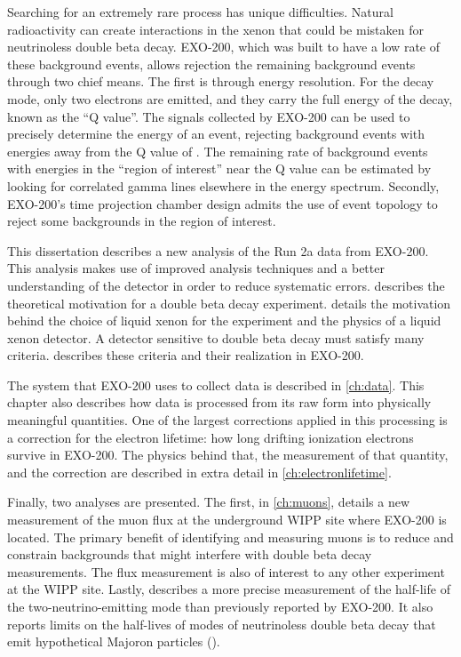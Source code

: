 \documentclass[herrin-thesis.tex]{subfiles}
\begin{document}
Searching for an extremely rare process has unique difficulties. Natural radioactivity can create interactions in the xenon that could be mistaken for neutrinoless double beta decay. EXO-200, which was built to have a low rate of these background events, allows rejection the remaining background events through two chief means. The first is through energy resolution. For the \zeronu{} decay mode, only two electrons are emitted, and they carry the full energy of the decay, known as the ``Q value''. The signals collected by EXO-200 can be used to precisely determine the energy of an event, rejecting background events with energies away from the Q value of . The remaining rate of background events with energies in the ``region of interest'' near the Q value can be estimated by looking for correlated gamma lines elsewhere in the energy spectrum. Secondly, EXO-200's time projection chamber design admits the use of event topology to reject some backgrounds in the region of interest.

This dissertation describes a new analysis of the Run 2a data from EXO-200. This analysis makes use of improved analysis techniques and a better understanding of the detector in order to reduce systematic errors.  describes the theoretical motivation for a double beta decay experiment.  details the motivation behind the choice of liquid xenon for the experiment and the physics of a liquid xenon detector. A detector sensitive to double beta decay must satisfy many criteria.  describes these criteria and their realization in EXO-200.

The system that EXO-200 uses to collect data is described in \cref{ch:data}. This chapter also describes how data is processed from its raw form into physically meaningful quantities. One of the largest corrections applied in this processing is a correction for the electron lifetime: how long drifting ionization electrons survive in EXO-200. The physics behind that, the measurement of that quantity, and the correction are described in extra detail in \cref{ch:electronlifetime}.

Finally, two analyses are presented. The first, in \cref{ch:muons}, details a new measurement of the muon flux at the underground WIPP site where EXO-200 is located. The primary benefit of identifying and measuring muons is to reduce and constrain backgrounds that might interfere with double beta decay measurements. The flux measurement is also of interest to any other experiment at the WIPP site. Lastly,  describes a more precise measurement of the half-life of the two-neutrino-emitting mode than previously reported by EXO-200. It also reports limits on the half-lives of modes of neutrinoless double beta decay that emit hypothetical Majoron particles (\zeronuXpX{}).
\end{document}
